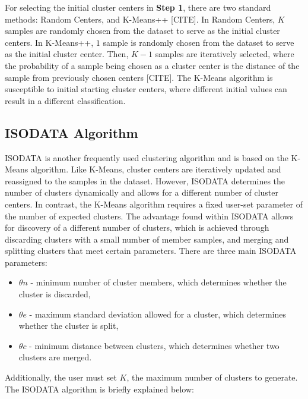 \documentclass[a4paper,10pt]{article}
\begin{document}
For selecting the initial cluster centers in \textbf{Step 1}, there are two
standard methods: Random Centers, and K-Means++ [CITE]. In Random Centers, $K$
samples are randomly chosen from the dataset to serve as the initial cluster
centers. In K-Means++, $1$ sample is randomly chosen from the dataset to serve
as the initial cluster center. Then, $K-1$ samples are iteratively selected,
where the probability of a sample being chosen as a cluster center is the
distance of the sample from previously chosen centers [CITE]. The K-Means
algorithm is susceptible to initial starting cluster centers, where different
initial values can result in a different classification.

\subsection{ISODATA Algorithm}

ISODATA is another frequently used clustering algorithm and is based on the
K-Means algorithm. Like K-Means, cluster centers are iteratively updated and
reassigned to the samples in the dataset. However, ISODATA determines the number
of clusters dynamically and allows for a different number of cluster centers. In
contrast, the K-Means algorithm requires a fixed user-set parameter of the
number of expected clusters. The advantage found within ISODATA allows for
discovery of a different number of clusters, which is achieved through
discarding clusters with a small number of member samples, and merging and
splitting clusters that meet certain parameters. There are three main ISODATA
parameters:

\begin{itemize}
      \item $\theta n$ - minimum number of cluster members, which determines
            whether the cluster is discarded,
      \item $\theta e$ - maximum standard deviation allowed for a cluster, which
            determines whether the cluster is split,
      \item $\theta c$ - minimum distance between clusters, which determines
            whether two clusters are merged.
\end{itemize}

Additionally, the user must set $K$, the maximum number of clusters to generate.
The ISODATA algorithm is briefly explained below:
\end{document}
